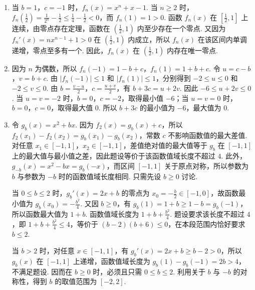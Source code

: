 \begin{solution}
\begin{enumerate}
\item 当 \(b=1\)，\(c=-1\) 时，\(f_n(x)=x^n+x-1\). 当 \(n\geqslant2\) 时，\(f_n\left(\frac{1}{2}\right)=\frac{1}{2^n}-\frac{1}{2}\leqslant\frac{1}{4}-\frac{1}{2}<0\)，而 \(f_n(1)=1>0\). 函数 \(f_n(x)\) 在 \(\left[\frac{1}{2},1\right]\) 上连续，由零点存在定理，函数在 \(\left(\frac{1}{2},1\right)\) 内至少存在一个零点. 又因为 \(f_n'(x)=nx^{n-1}+1>0\) 在 \(\left(\frac{1}{2},1\right)\) 内成立，所以 \(f_n(x)\) 在该区间内单调递增，零点至多有一个. 因此，\(f_n(x)\) 在 \(\left(\frac{1}{2},1\right)\) 内存在唯一零点.

\item 因为 \(n\) 为偶数，所以 \(f_n(-1)=1-b+c\)，\(f_n(1)=1+b+c\). 令 \(u=c-b\)，\(v=b+c\). 由 \(\lvert f_n(-1)\rvert\leqslant1\) 和 \(\lvert f_n(1)\rvert\leqslant1\)，分别得到 \(-2\leqslant u\leqslant0\) 和 \(-2\leqslant v\leqslant0\). 由 \(b=\frac{v-u}{2}\)，\(c=\frac{u+v}{2}\)，有 \(b+3c=u+2v\). 因此 \(-6\leqslant u+2v\leqslant0\). 当 \(u=v=-2\) 时，\(b=0\)，\(c=-2\)，取得最小值 \(-6\)；当 \(u=v=0\) 时，\(b=0\)，\(c=0\)，取得最大值 \(0\). 所以 \(b+3c\) 的最小值为 \(-6\)，最大值为 \(0\).

\item 令 \(g_b(x)=x^2+bx\). 因为 \(f_2(x)=g_b(x)+c\)，所以 \(f_2(x_1)-f_2(x_2)=g_b(x_1)-g_b(x_2)\)，常数 \(c\) 不影响函数值的最大差值. 对任意 \(x_1\in[-1,1]\)，\(x_2\in[-1,1]\)，差值绝对值的最大值等于 \(g_b\) 在 \([-1,1]\) 上的最大值与最小值之差，因此题设等价于该函数值域长度不超过 \(4\). 此外，\(g_{-b}(x)=x^2-bx=g_b(-x)\)，而区间 \([-1,1]\) 关于原点对称，所以参数为 \(b\) 与参数为 \(-b\) 时的函数值域长度相同. 只需先设 \(b\geqslant0\) 讨论.

当 \(0\leqslant b\leqslant2\) 时，\(g_b'(x)=2x+b\) 的零点为 \(x_0=-\frac{b}{2}\in[-1,0]\)，故函数最小值为 \(g_b(x_0)=-\frac{b^2}{4}\). 又因 \(b\geqslant0\)，有 \(g_b(1)=1+b\geqslant1-b=g_b(-1)\)，所以函数最大值为 \(1+b\). 函数值域长度为 \(1+b+\frac{b^2}{4}\). 题设要求该长度不超过 \(4\)，即 \(1+b+\frac{b^2}{4}\leqslant4\)，等价于 \((b-2)(b+6)\leqslant0\)，在本段范围内恰好要求 \(b\leqslant2\).

当 \(b>2\) 时，对任意 \(x\in[-1,1]\)，有 \(g_b'(x)=2x+b\geqslant b-2>0\)，所以 \(g_b(x)\) 在 \([-1,1]\) 上递增，函数值域长度为 \(g_b(1)-g_b(-1)=2b>4\)，不满足题设. 因而在 \(b\geqslant0\) 时，必须且只需 \(0\leqslant b\leqslant2\). 利用关于 \(b\) 与 \(-b\) 的对称性，得到 \(b\) 的取值范围为 \([-2,2]\).
\end{enumerate}
\end{solution}
